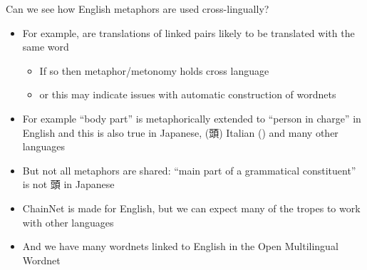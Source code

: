 \documentclass[dvipsnames]{beamer}
\begin{document}
\begin{frame}{Can we see how English metaphors are used cross-lingually?}
  \begin{itemize}
  \item For example, are translations of linked pairs likely to be
    translated with the same word
    \begin{itemize}
    \item If so then metaphor/metonomy holds cross language
    \item[\ldots] or this may indicate issues with automatic construction of wordnets
    \end{itemize}
  \item For example  ``body part'' is metaphorically
    extended to ``person in charge'' in English and this is also true in Japanese,
    (頭) Italian () and many other languages
  \item But not all metaphors are shared:   ``main part of a grammatical constituent'' is not 頭 in Japanese
    \bigskip
  \item ChainNet is made for English, but we can expect many of the
    tropes to work with other languages
  \item And we have many wordnets linked to English in the Open Multilingual Wordnet
    

  \end{itemize}
\end{frame}
\end{document}
